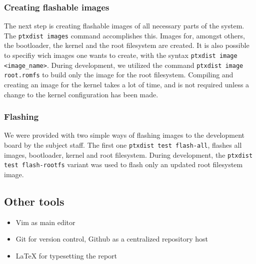 \subsubsection{Creating flashable images}

The next step is creating flashable images of all necessary parts of the system. The \texttt{ptxdist images} command accomplishes this. Images for, amongst others, the bootloader, the kernel and the root filesystem are created. It is also possible to specifiy wich images one wants to create, with the syntax \texttt{ptxdist image <image\_name>}. During development, we utilized the command \texttt{ptxdist image root.romfs} to build only the image for the root filesystem. Compiling and creating an image for the kernel takes a lot of time, and is not required unless a change to the kernel configuration has been made.

\subsubsection{Flashing}

We were provided with two simple ways of flashing images to the development board by the subject staff. The first one \texttt{ptxdist test flash-all}, flashes all images, bootloader, kernel and root filesystem. During development, the \texttt{ptxdist test flash-rootfs} variant was used to flash only an updated root filesystem image.

\subsection{Other tools}

\begin{itemize}
\item Vim as main editor
\item Git for version control, Github as a centralized repository host
\item \LaTeX{} for typesetting the report
\end{itemize}
